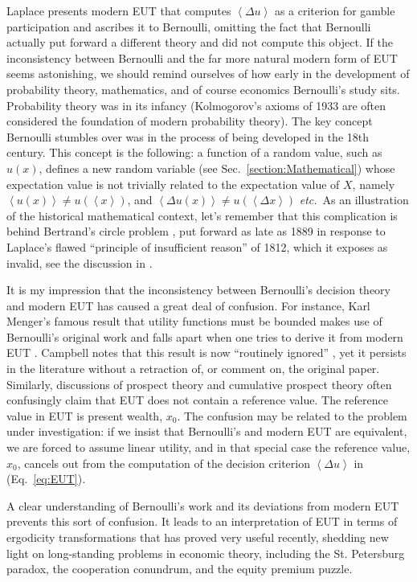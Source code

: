 \documentclass[pdftex]{article}
\newcommand{\etc}{{\it etc.}\ }
\newcommand{\ave}[1]{\left\langle#1 \right\rangle}
\newcommand{\eref}[1]{(Eq.~\ref{eq:#1})}
\newcommand{\secref}[1]{Sec.~\ref{section:#1}}
\newcommand{\Dx}{{\Delta x}}
\newcommand{\Du}{\Delta u}
\begin{document}
Laplace presents modern EUT that computes $\ave{\Du}$ as a criterion for gamble participation and ascribes it to Bernoulli, omitting the fact that Bernoulli actually put forward a different theory and did not compute this object. If the inconsistency between Bernoulli and the far more natural modern form of EUT seems astonishing, we should remind ourselves of how early in the development of probability theory, mathematics, and of course economics Bernoulli's study sits. Probability theory was in its infancy (Kolmogorov's axioms of 1933 \cite{Kolmogorov1933} are often considered the foundation of modern probability theory). The key concept Bernoulli stumbles over was in the process of being developed in the 18th century. This concept is the following:  a function of a random value, such as $u(x)$, defines a new random variable (see \secref{Mathematical}) whose expectation value is not trivially related to the expectation value of $X$, namely $\ave{u(x)}\neq u(\ave{x})$, and $\ave{\Du(x)}\neq u(\ave\Dx)$ \etc As an illustration of the historical mathematical context, let's remember that this complication is behind Bertrand's circle problem \cite{Bertrand1889}, put forward as late as 1889 in response to Laplace's flawed ``principle of insufficient reason'' of 1812, which it exposes as invalid, see the discussion in \cite[p.~20]{vanKampen2007}.

It is my impression that the inconsistency between Bernoulli's decision theory and modern EUT has caused a great deal of confusion. For instance, Karl Menger's famous result that utility functions must be bounded \cite{Menger1934} makes use of Bernoulli's original work and falls apart when one tries to derive it from modern EUT \cite{Peters2011c,PetersGell-Mann2016}. Campbell notes that this result is now ``routinely ignored'' \cite[p.~5]{Campbell2017}, yet it persists in the literature without a retraction of, or comment on, the original paper. Similarly, discussions of prospect theory and cumulative prospect theory often confusingly claim that EUT does not contain a reference value. The reference value in EUT is present wealth, $x_0$. The confusion may be related to the problem under investigation: if we insist that Bernoulli's and modern EUT are equivalent, we are forced to assume linear utility, and in that special case the reference value, $x_0$, cancels out from the computation of the decision criterion $\ave{\Du}$ in \eref{EUT}.

A clear understanding of Bernoulli's work and its deviations from modern EUT prevents this sort of confusion. It leads to an interpretation of EUT in terms of ergodicity transformations that has proved very useful recently, shedding new light on long-standing problems in economic theory, including the St. Petersburg paradox, the cooperation conundrum, and the equity premium puzzle.



\end{document}
